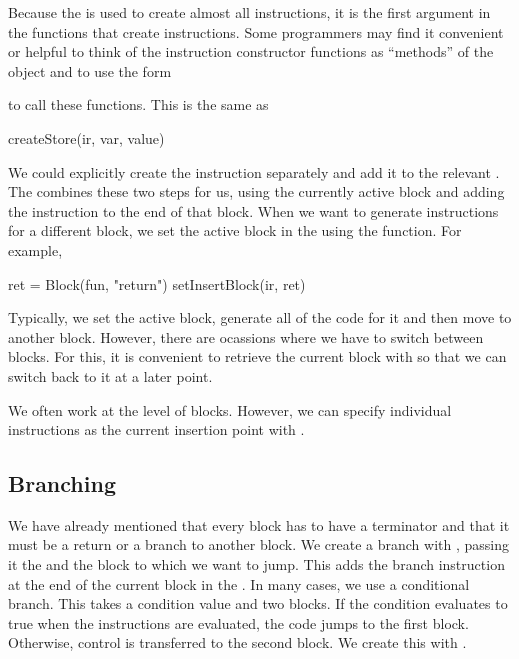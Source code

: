 \documentclass[article]{jss}
\begin{document}
Because the  is used to create almost all
instructions, it is the first argument in the functions
that create instructions.
Some programmers may find it convenient or helpful to 
think of the instruction constructor functions
as ``methods'' of the  object and
to use the form
to call these functions.
This is the same as
\begin{RCode}
createStore(ir, var, value)
\end{RCode}

We could explicitly create the instruction separately and add it to
the relevant .  The  combines these
two steps for us, using the currently active block and adding the
instruction to the end of that block.  When we want to generate
instructions for a different block, we set the active block in the
 using the  function.
For example, 
\begin{RCode}
ret = Block(fun, "return")
setInsertBlock(ir, ret)
\end{RCode}

Typically, we set the active block, generate all of the code for it
and then move to another block.  However, there are ocassions where we
have to switch between blocks. For this, it is convenient to retrieve
the current block with  so that we can switch
back to it at a later point.

We often work at the level of blocks. However, we can specify
individual instructions as the current insertion point
with .%








\subsection{Branching}
We have already mentioned that every block has to have a terminator
and that it must be a return or a branch to another block.  We create
a branch with , passing it the 
and the block to which we want to jump. This adds the branch
instruction at the end of the current block in the .
In many cases, we use a conditional branch.
This takes a condition value and two blocks.
If the condition evaluates to true when the instructions are
evaluated,
the code jumps to the first block. Otherwise, control is transferred to the second block.
We create this with .
\end{document}
